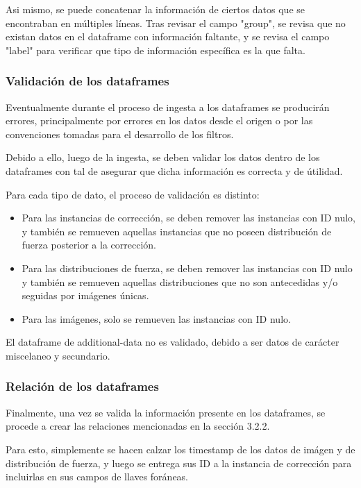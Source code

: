 Asi mismo, se puede concatenar la información de ciertos datos que se encontraban en múltiples líneas. Tras revisar el campo "group", se revisa que no existan datos en el dataframe con información faltante, y se revisa el campo "label" para verificar que tipo de información específica es la que falta.

\subsubsection{Validación de los dataframes}

Eventualmente durante el proceso de ingesta a los dataframes se producirán errores, principalmente por errores en los datos desde el origen o por las convenciones tomadas para el desarrollo de los filtros.

Debido a ello, luego de la ingesta, se deben validar los datos dentro de los dataframes con tal de asegurar que dicha información es correcta y de útilidad.

Para cada tipo de dato, el proceso de validación es distinto:

\begin{itemize}
    \item Para las instancias de corrección, se deben remover las instancias con ID nulo, y también se remueven aquellas instancias que no poseen distribución de fuerza posterior a la corrección.

    \item Para las distribuciones de fuerza, se deben remover las instancias con ID nulo y también se remueven aquellas distribuciones que no son antecedidas y/o seguidas por imágenes únicas.

    \item Para las imágenes, solo se remueven las instancias con ID nulo.
\end{itemize}

El dataframe de additional-data no es validado, debido a ser datos de carácter miscelaneo y secundario.

\subsubsection{Relación de los dataframes}

Finalmente, una vez se valida la información presente en los dataframes, se procede a crear las relaciones mencionadas en la sección 3.2.2.

Para esto, simplemente se hacen calzar los timestamp de los datos de imágen y de distribución de fuerza, y luego se entrega sus ID a la instancia de corrección para incluirlas en sus campos de llaves foráneas.